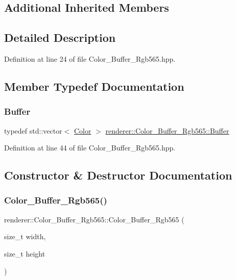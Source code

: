 \subsection*{Additional Inherited Members}


\subsection{Detailed Description}


Definition at line 24 of file Color\+\_\+\+Buffer\+\_\+\+Rgb565.\+hpp.



\subsection{Member Typedef Documentation}
\mbox{\label{classrenderer_1_1_color___buffer___rgb565_a60feae2b617049e32ecfb9e87349272c}} 
\subsubsection{\texorpdfstring{Buffer}{Buffer}}
{\footnotesize\ttfamily typedef std\+::vector$<$ \mbox{\hyperlink{structrenderer_1_1_color___buffer___rgb565_1_1_color}{Color}} $>$ \mbox{\hyperlink{classrenderer_1_1_color___buffer___rgb565_a60feae2b617049e32ecfb9e87349272c}{renderer\+::\+Color\+\_\+\+Buffer\+\_\+\+Rgb565\+::\+Buffer}}}



Definition at line 44 of file Color\+\_\+\+Buffer\+\_\+\+Rgb565.\+hpp.



\subsection{Constructor \& Destructor Documentation}
\mbox{\label{classrenderer_1_1_color___buffer___rgb565_ad08f0151e303070965a5c4624577a823}} 
\subsubsection{\texorpdfstring{Color\_Buffer\_Rgb565()}{Color\_Buffer\_Rgb565()}}
{\footnotesize\ttfamily renderer\+::\+Color\+\_\+\+Buffer\+\_\+\+Rgb565\+::\+Color\+\_\+\+Buffer\+\_\+\+Rgb565 (\begin{DoxyParamCaption}\item[{size\+\_\+t}]{width,  }\item[{size\+\_\+t}]{height }\end{DoxyParamCaption})\hspace{0.3cm}{\ttfamily [inline]}}




